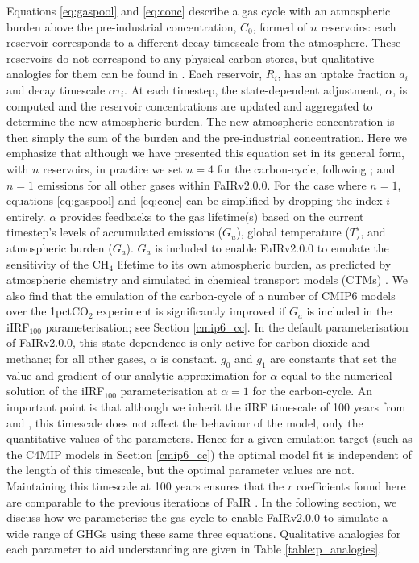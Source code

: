 \documentclass[gmd, manuscript]{copernicus}
\begin{document}
Equations \ref{eq:gaspool} and \ref{eq:conc} describe a gas cycle with an atmospheric burden above the pre-industrial concentration, $C_0$, formed of $n$ reservoirs: each reservoir corresponds to a different decay timescale from the atmosphere. These reservoirs do not correspond to any physical carbon stores, but qualitative analogies for them can be found in \citet{Millar2016}. Each reservoir, $R_i$, has an uptake fraction $a_i$ and decay timescale $\alpha \tau_i$. At each timestep, the state-dependent adjustment, $\alpha$, is computed and the reservoir concentrations are updated and aggregated to determine the new atmospheric burden. The new atmospheric concentration is then simply the sum of the burden and the pre-industrial concentration. Here we emphasize that although we have presented this equation set in its general form, with $n$ reservoirs, in practice we set $n=4$ for the carbon-cycle, following \citet{Joos2013}; and $n=1$ emissions for all other gases within FaIRv2.0.0. For the case where $n=1$, equations \ref{eq:gaspool} and \ref{eq:conc} can be simplified by dropping the index $i$ entirely. $\alpha$ provides feedbacks to the gas lifetime(s) based on the current timestep’s levels of accumulated emissions ($G_u$), global temperature ($T$), and atmospheric burden ($G_a$). $G_a$ is included to enable FaIRv2.0.0 to emulate the sensitivity of the CH$_4$ lifetime to its own atmospheric burden, as predicted by atmospheric chemistry and simulated in chemical transport models (CTMs) \citep{Holmes2013,Prather2015}. We also find that the emulation of the carbon-cycle of a number of CMIP6 models over the 1pctCO$_2$ experiment is significantly improved if $G_a$ is included in the iIRF$_{100}$ parameterisation; see Section \ref{cmip6_cc}. In the default parameterisation of FaIRv2.0.0, this state dependence is only active for carbon dioxide and methane; for all other gases, $\alpha$ is constant. $g_0$ and $g_1$ are constants that set the value and gradient of our analytic approximation for $\alpha$ equal to the numerical solution of the \citet{Millar2016} iIRF$_{100}$ parameterisation at $\alpha = 1$ for the carbon-cycle. An important point is that although we inherit the iIRF timescale of 100 years from \citet{Millar2016} and \citet{Joos2013}, this timescale does not affect the behaviour of the model, only the quantitative values of the parameters. Hence for a given emulation target (such as the C4MIP models in Section \ref{cmip6_cc}) the optimal model fit is independent of the length of this timescale, but the optimal parameter values are not. Maintaining this timescale at 100 years ensures that the $r$ coefficients found here are comparable to the previous iterations of FaIR \citep{Smith2018,Millar2016}. In the following section, we discuss how we parameterise the gas cycle to enable FaIRv2.0.0 to simulate a wide range of GHGs using these same three equations. Qualitative analogies for each parameter to aid understanding are given in Table \ref{table:p_analogies}.\\\\
\end{document}

